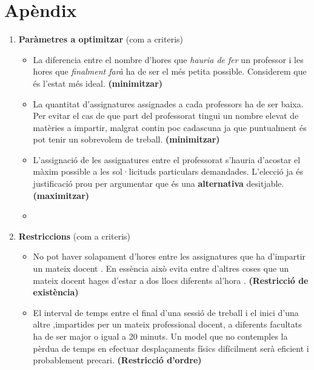 \documentclass[10pt,twocolumn]{article}
\begin{document}
\section*{Apèndix}
\begin{enumerate}
	\item \textbf{Paràmetres a optimitzar } (com a criteris) 
	\begin{itemize}
		\item La diferencia entre el nombre d'hores que \textit{hauria de fer} un professor i les hores que \textit{finalment farà} ha de ser el més petita possible. {\color{gray} Considerem que és l'estat més ideal.} \textbf{(minimitzar)} 
		\item La quantitat d'assignatures assignades a cada professors ha de ser baixa. 
		{\color{gray}  Per evitar el cas de que part del professorat tingui un nombre elevat de matèries a impartir, malgrat contin poc cadascuna ja que puntualment és pot tenir un sobrevolem de treball.} \textbf{(minimitzar)}
		\item L'assignació de les assignatures entre el professorat s'hauria d'acostar el màxim possible a les sol·licituds particulars demandades. {\color{gray}  L'elecció ja és justificació prou per argumentar que és una \textbf{alternativa} desitjable.} \textbf{(maximitzar)}
		\item 
	\end{itemize}
    \item \textbf{Restriccions} (com a criteris)
    \begin{itemize}
    	\item No pot haver solapament d'hores entre les assignatures que ha d'impartir un mateix docent . {\color{gray} En essència això evita entre d'altres coses que un mateix docent hages d'estar a dos llocs diferents al'hora .} \textbf{(Restricció de existència)} 
    	\item El interval de temps entre el final d'una sessió de treball i el inici d'una altre ,impartides per un mateix professional docent, a diferents facultats ha de ser major o igual a 20 minuts. {\color{gray} Un model que no contemples la pèrdua de temps en efectuar desplaçaments físics difícilment serà eficient i probablement precari.} \textbf{(Restricció d'ordre)} 

\end{itemize}
\end{enumerate}
\end{document}

